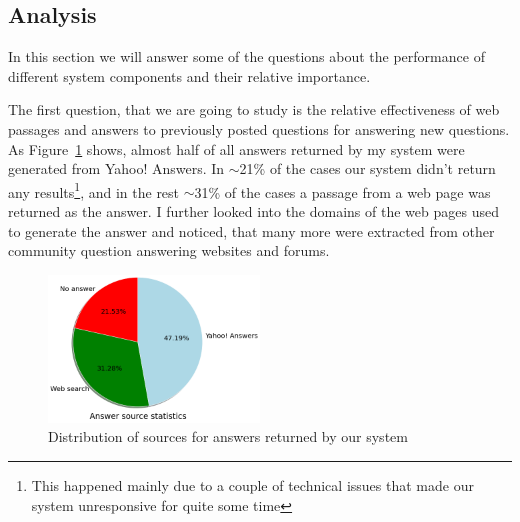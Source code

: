 \subsection{Analysis}
\label{section:non-factoid:liveqa:analysis}

In this section we will answer some of the questions about the performance of different system components and their relative importance.

The first question, that we are going to study is the relative effectiveness of web passages and answers to previously posted questions for answering new questions.
As Figure~\ref{figure:non-factoid:liveqa:answer_source_pie} shows, almost half of all answers returned by my system were generated from Yahoo! Answers.
In $\sim$21\% of the cases our system didn't return any results\footnote{This happened mainly due to a couple of technical issues that made our system unresponsive for quite some time}, and in the rest $\sim$31\% of the cases a passage from a web page was returned as the answer.
I further looked into the domains of the web pages used to generate the answer and noticed, that many more were extracted from other community question answering websites and forums.

\begin{figure}
	\centering
	\includegraphics[width=0.5\textwidth]{img/liveqa_answer_source}
	\caption{Distribution of sources for answers returned by our system}
	\label{figure:non-factoid:liveqa:answer_source_pie}
\end{figure}

